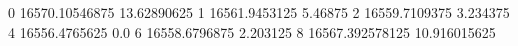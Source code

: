 0 16570.10546875 13.62890625
1 16561.9453125 5.46875
2 16559.7109375 3.234375
4 16556.4765625 0.0
6 16558.6796875 2.203125
8 16567.392578125 10.916015625
